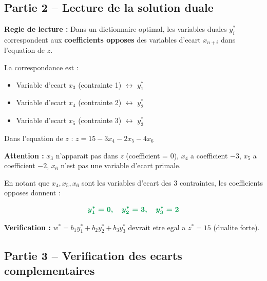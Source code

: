 \documentclass[12pt,a4paper]{article}
\begin{document}
\subsection{Partie 2 -- Lecture de la solution duale}

\begin{correction}
\textbf{Regle de lecture :} Dans un dictionnaire optimal, les variables duales $y_i^*$ correspondent aux \textcolor{importantrouge}{\textbf{coefficients opposes}} des variables d'ecart $x_{n+i}$ dans l'equation de $z$.

La correspondance est :
\begin{itemize}
    \item Variable d'ecart $x_3$ (contrainte 1) $\leftrightarrow$ $y_1^*$
    \item Variable d'ecart $x_4$ (contrainte 2) $\leftrightarrow$ $y_2^*$
    \item Variable d'ecart $x_5$ (contrainte 3) $\leftrightarrow$ $y_3^*$
\end{itemize}

Dans l'equation de $z$ : $z = 15 - 3x_4 - 2x_5 - 4x_6$

\textbf{Attention :} $x_3$ n'apparait pas dans $z$ (coefficient = 0), $x_4$ a coefficient $-3$, $x_5$ a coefficient $-2$, $x_6$ n'est pas une variable d'ecart primale.

En notant que $x_4, x_5, x_6$ sont les variables d'ecart des 3 contraintes, les coefficients opposes donnent :

$$\textcolor{defvert}{\boldsymbol{y_1^* = 0, \quad y_2^* = 3, \quad y_3^* = 2}}$$

\textbf{Verification :} $w^* = b_1 y_1^* + b_2 y_2^* + b_3 y_3^*$ devrait etre egal a $z^* = 15$ (dualite forte).
\end{correction}

\subsection{Partie 3 -- Verification des ecarts complementaires}
\end{document}
